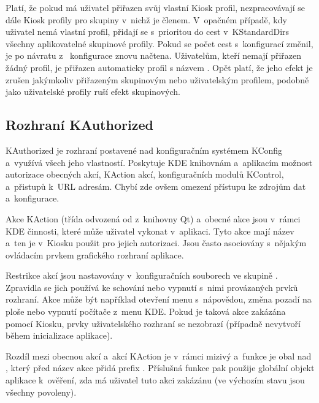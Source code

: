 Platí, že pokud má uživatel přiřazen svůj vlastní Kiosk profil, nezpracovávají se dále Kiosk profily pro skupiny v~nichž je členem. V~opačném případě, kdy uživatel nemá vlastní profil, přidají se s~prioritou do cest v~KStandardDirs všechny aplikovatelné skupinové profily. Pokud se počet cest s~konfigurací změnil, je po návratu z~ konfigurace znovu načtena. Uživatelům, kteří nemají přiřazen žádný profil, je přiřazen automaticky profil s názvem . Opět platí, že jeho efekt je zrušen jakýmkoliv přiřazeným skupinovým nebo uživatelským profilem, podobně jako uživatelské profily ruší efekt skupinových.

\subsection*{Rozhraní KAuthorized}
KAuthorized je rozhraní postavené nad konfiguračním systémem KConfig a~využívá všech jeho vlastností. Poskytuje KDE knihovnám a~aplikacím možnost autorizace obecných akcí, KAction akcí, konfiguračních modulů KControl, a~přistupů k~URL adresám. Chybí zde ovšem omezení přístupu ke zdrojům dat a~konfigurace.

Akce KAction (třída  odvozená od  z~knihovny Qt) a~obecné akce jsou v~rámci KDE činnosti, které může uživatel vykonat v~aplikaci. Tyto akce mají název a~ten je v~Kiosku použit pro jejich autorizaci. Jsou často asociovány s~nějakým ovládacím prvkem grafického rozhraní aplikace.

Restrikce akcí jsou nastavovány v~konfiguračních souborech ve skupině \linebreak{}. Zpravidla se jich používá ke schování nebo vypnutí s~nimi provázaných prvků rozhraní. Akce může být například otevření menu s~nápovědou, změna pozadí na ploše nebo vypnutí počítače z~menu KDE. Pokud je taková akce zakázána pomocí Kiosku, prvky uživatelského rozhraní se nezobrazí (případně nevytvoří během inicializace aplikace).

Rozdíl mezi obecnou akcí a~akcí KAction je v~rámci  mizivý a~funkce \linebreak{} je obal nad , který před název akce přidá prefix . Příslušná funkce pak použije globální  objekt aplikace k~ověření, zda má uživatel tuto akci zakázánu (ve výchozím stavu jsou všechny povoleny).

